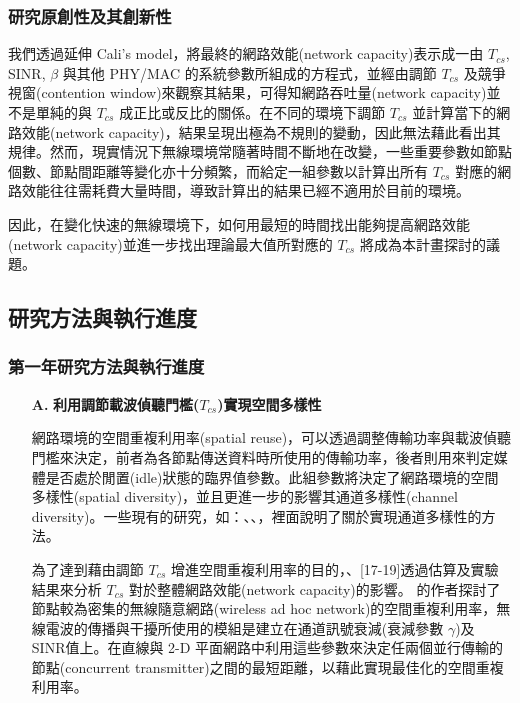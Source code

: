 \documentclass[12pt,a4paper]{article}
\begin{document}
\begin{description}
\subsubsection{研究原創性及其創新性}%

我們透過延伸 Cali’s  model\cite{tn00_cali}，將最終的網路效能(network capacity)表示成一由 $T_{cs}$, SINR, $\beta$ 與其他 PHY/MAC 的系統參數所組成的方程式，並經由調節 $T_{cs}$ 及競爭視窗(contention window)來觀察其結果，可得知網路吞吐量(network capacity)並不是單純的與 $T_{cs}$ 成正比或反比的關係。在不同的環境下調節 $T_{cs}$ 並計算當下的網路效能(network capacity)，結果呈現出極為不規則的變動，因此無法藉此看出其規律。然而，現實情況下無線環境常隨著時間不斷地在改變，一些重要參數如節點個數、節點間距離等變化亦十分頻繁，而給定一組參數以計算出所有 $T_{cs}$ 對應的網路效能往往需耗費大量時間，導致計算出的結果已經不適用於目前的環境。 

因此，在變化快速的無線環境下，如何用最短的時間找出能夠提高網路效能(network capacity)並進一步找出理論最大值所對應的 $T_{cs}$ 將成為本計畫探討的議題。\\

\subsection{研究方法與執行進度}
\subsubsection{第一年研究方法與執行進度}

\begin{enumerate}
\setlength\parindent{2em}    %
\item [\bf A.]{\textbf{\Kai 利用調節載波偵聽門檻($T_{cs}$)實現空間多樣性 }}\\
\vspace{-2mm}

網路環境的空間重複利用率(spatial reuse)，可以透過調整傳輸功率與載波偵聽門檻來決定，前者為各節點傳送資料時所使用的傳輸功率，後者則用來判定媒體是否處於閒置(idle)狀態的臨界值參數。此組參數將決定了網路環境的空間多樣性(spatial diversity)，並且更進一步的影響其通道多樣性(channel diversity)。一些現有的研究，如：\cite{ccr2004_rws}、\cite{mobicom04_ssch}、\cite{mobihoc04_mcmac}，裡面說明了關於實現通道多樣性的方法。

為了達到藉由調節 $T_{cs}$ 增進空間重複利用率的目的，\cite{vtc03_sr}、[17-19]透過估算及實驗結果來分析 $T_{cs}$ 對於整體網路效能(network capacity)的影響。 
\cite{vtc03_sr}的作者探討了節點較為密集的無線隨意網路(wireless ad hoc network)的空間重複利用率，無線電波的傳播與干擾所使用的模組是建立在通道訊號衰減(衰減參數 $\gamma$)及 SINR值上。在直線與 2-D 平面網路中利用這些參數來決定任兩個並行傳輸的節點(concurrent transmitter)之間的最短距離，以藉此實現最佳化的空間重複利用率。 


\end{enumerate}
\end{description}
\end{document}
